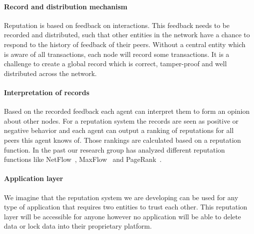 \paragraph{Record and distribution mechanism} Reputation is based on feedback on interactions. 
This feedback needs to be recorded and distributed, such that other entities in the
network have a chance to respond to the history of feedback of their peers. Without a central entity
which is aware of all transactions, each node will record some transactions. It is a challenge to 
create a global record which is correct, tamper-proof and well distributed across the network.

\paragraph{Interpretation of records} Based on the recorded feedback each agent can interpret them
to form an opinion about other nodes. For a reputation system the records are seen as positive or
negative behavior and each agent can output a ranking of reputations for all peers this agent knows
of. Those rankings are calculated based on a reputation function. In the past our research group has
analyzed different reputation functions like NetFlow~\cite{OTTE2017}, 
MaxFlow~\cite{meulpolder2009bartercast} and PageRank~\cite{page1999pagerank}.

\paragraph{Application layer} We imagine that the reputation system we are developing can be used 
for any type of application that requires two entities to trust each other. This reputation layer 
will be accessible for anyone however no application will be able to delete data or lock data into
their proprietary platform. 


